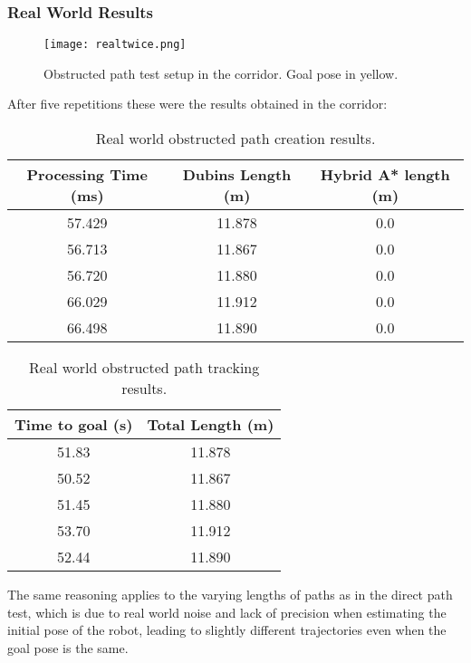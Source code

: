\subsubsection{Real World Results}
\begin{figure}[h]
    \centering
    \texttt{[image: realtwice.png]}
    \caption{Obstructed path test setup in the corridor. Goal pose in yellow.}
    \label{fig:real_obstructed}
\end{figure}

After five repetitions these were the results obtained in the corridor:

\begin{table}[H]
    \centering
    \begin{tabular}{|c|c|c|}
        \hline
        \textbf{Processing Time (ms)} & \textbf{Dubins Length (m)} & \textbf{Hybrid A* length (m)} \\
        \hline
         57.429 & 11.878 & 0.0 \\
        \hline
         56.713 & 11.867 & 0.0 \\
         \hline
         56.720 & 11.880 & 0.0 \\
         \hline
         66.029 & 11.912 & 0.0 \\
         \hline
         66.498 & 11.890 & 0.0 \\
         \hline
    \end{tabular}
    \caption{Real world obstructed path creation results.}
    \label{tab:obstructed_path_results3}
\end{table}
\begin{table}[H]
    \centering
    \begin{tabular}{|c|c|}
        \hline
        \textbf{Time to goal (s)} & \textbf{Total Length (m)} \\
         \hline
         51.83 & 11.878 \\
         \hline
         50.52 & 11.867 \\
         \hline
         51.45 & 11.880 \\
         \hline
         53.70 & 11.912 \\
         \hline
         52.44 & 11.890 \\
         \hline
    \end{tabular}
    \caption{Real world obstructed path tracking results.}
    \label{tab:obstructed_path_results4}
\end{table}

The same reasoning applies to the varying lengths of paths as in the direct 
path test, which is due to real world noise and lack of precision when 
estimating the initial pose of the robot, leading to slightly different trajectories 
even when the goal pose is the same.
\clearpage

